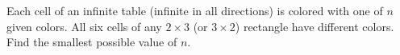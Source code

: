 Each cell of an infinite table (infinite in all directions) is colored with one of $n$ given colors. All six cells of any $2\times 3$ (or $3 \times 2$) rectangle have different colors. Find the smallest possible value of $n$.